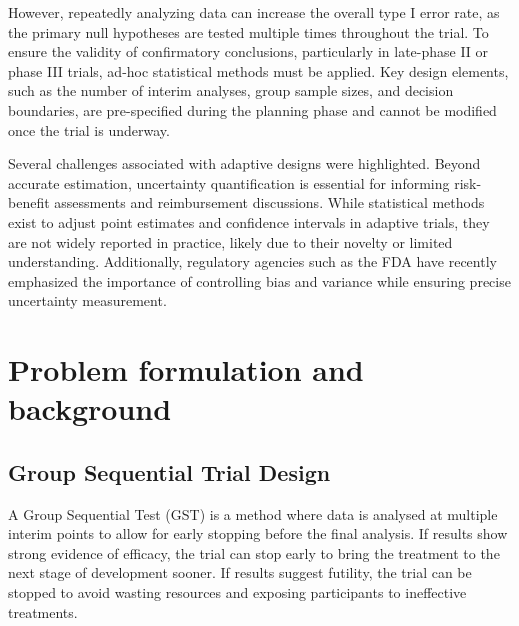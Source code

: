 \documentclass[12pt,a4paper]{article}
\begin{document}
However, repeatedly analyzing data can increase the overall type I error rate, as the primary null hypotheses are tested multiple times throughout the trial. To ensure the validity of confirmatory conclusions, particularly in late-phase II or phase III trials, ad-hoc statistical methods must be applied. Key design elements, such as the number of interim analyses, group sample sizes, and decision boundaries, are pre-specified during the planning phase and cannot be modified once the trial is underway.

Several challenges associated with adaptive designs were highlighted. Beyond accurate estimation, uncertainty quantification is essential for informing risk-benefit assessments and reimbursement discussions. While statistical methods exist to adjust point estimates and confidence intervals in adaptive trials, they are not widely reported in practice, likely due to their novelty or limited understanding. Additionally, regulatory agencies such as the FDA have recently emphasized the importance of controlling bias and variance while ensuring precise uncertainty measurement. %

\section{Problem formulation and background}



\subsection{Group Sequential Trial Design}
A Group Sequential Test (GST) is a method where data is analysed at multiple interim points to allow for early stopping before the final analysis. If results show strong evidence of efficacy, the trial can stop early to bring the treatment to the next stage of development sooner. If results suggest futility, the trial can be stopped to avoid wasting resources and exposing participants to ineffective treatments. 
\end{document}
